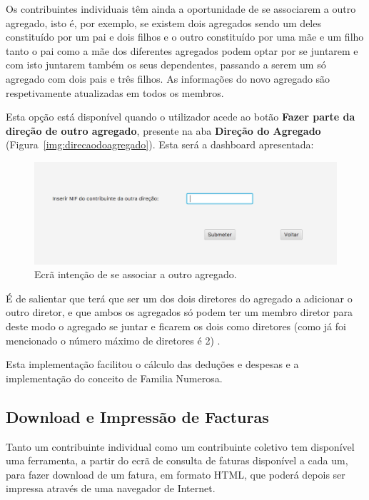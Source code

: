 \documentclass[a4paper]{article}
\begin{document}
Os contribuintes individuais têm ainda a oportunidade de se associarem a outro agregado,
isto é, por exemplo, se existem dois agregados sendo um deles constituído por um pai e dois
filhos e o outro constituído por uma mãe e um filho tanto o pai como a mãe dos diferentes
agregados podem optar por
se juntarem e com isto juntarem também os seus dependentes, passando a serem um só agregado
com dois pais e três filhos. As informações do novo agregado são respetivamente atualizadas
em todos os membros.

Esta opção está disponível quando o utilizador acede ao botão
\textbf{Fazer parte da direção de outro agregado}, presente na aba
\textbf{Direção do Agregado} (Figura~\ref{img:direcaodoagregado}).
Esta será a dashboard apresentada:

\begin{figure}[H]
\centering
\includegraphics[scale=0.35]{imgs/direcaooutroagregado.png}
\caption{Ecrã intenção de se associar a outro agregado.}
\label{img:direcaooutroagregado}
\end{figure}

É de salientar que terá que ser um dos dois diretores do agregado a adicionar o outro
diretor, e que ambos os agregados só podem ter um membro diretor para deste modo
o agregado se juntar e ficarem os dois como diretores (como já foi mencionado o
número máximo de diretores é 2) .

\vspace{0.2cm}

Esta implementação facilitou o cálculo das deduções e despesas e a
implementação do conceito de Familia Numerosa.



\subsection{Download e Impressão de Facturas}
\label{sec:imprimirfacturas}

Tanto um contribuinte individual como um contribuinte coletivo tem disponível
uma ferramenta, a partir do ecrã de consulta de faturas disponível a cada um,
para fazer download de um fatura, em formato HTML, que poderá
depois ser impressa através de uma navegador de Internet.
\end{document}
